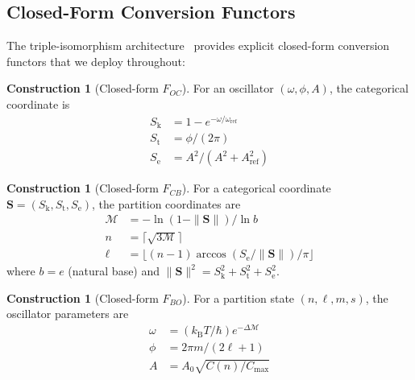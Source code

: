 \documentclass[11pt,twocolumn,a4paper]{article}
\theoremstyle{definition}
\newtheorem{construction}[theorem]{Construction}
\theoremstyle{remark}
\newcommand{\kB}{k_{\mathrm{B}}}
\newcommand{\Sk}{S_{\mathrm{k}}}
\newcommand{\St}{S_{\mathrm{t}}}
\newcommand{\Se}{S_{\mathrm{e}}}
\newcommand{\Scoord}{\mathbf{S}}
\newcommand{\depth}{\mathcal{M}}
\begin{document}
\subsection{Closed-Form Conversion Functors}

The triple-isomorphism architecture~\citep{sachikonye2025_isomorphism} provides explicit closed-form conversion functors that we deploy throughout:

\begin{construction}[Closed-form $F_{OC}$]
\label{cons:foc}
For an oscillator $(\omega, \phi, A)$, the categorical coordinate is
\begin{align}
\Sk &= 1 - e^{-\omega/\omega_{\mathrm{ref}}} \label{eq:foc_sk} \\
\St &= \phi/(2\pi) \label{eq:foc_st} \\
\Se &= A^2/(A^2 + A_{\mathrm{ref}}^2) \label{eq:foc_se}
\end{align}
\end{construction}

\begin{construction}[Closed-form $F_{CB}$]
\label{cons:fcb}
For a categorical coordinate $\Scoord = (\Sk, \St, \Se)$, the partition coordinates are
\begin{align}
\depth &= -\ln(1 - \|\Scoord\|)/\ln b \label{eq:fcb_M} \\
n &= \lceil\sqrt{3\depth}\rceil \label{eq:fcb_n} \\
\ell &= \lfloor (n-1) \arccos(\Se/\|\Scoord\|)/\pi \rfloor \label{eq:fcb_l}
\end{align}
where $b = e$ (natural base) and $\|\Scoord\|^2 = \Sk^2 + \St^2 + \Se^2$.
\end{construction}

\begin{construction}[Closed-form $F_{BO}$]
\label{cons:fbo}
For a partition state $(n, \ell, m, s)$, the oscillator parameters are
\begin{align}
\omega &= (\kB T/\hbar) e^{-\Delta\depth} \label{eq:fbo_omega} \\
\phi &= 2\pi m/(2\ell + 1) \label{eq:fbo_phi} \\
A &= A_0 \sqrt{C(n)/C_{\max}} \label{eq:fbo_A}
\end{align}
\end{construction}
\end{document}

